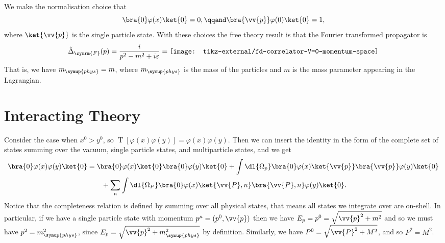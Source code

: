 \documentclass[fleqn]{NotesClass}
\DeclareMathOperator{\timeOrdering}{T}
\newcommand{\feynman}{\symrm{F}}
\newcommand{\phys}{\symup{phys}}
\begin{document}
    We make the normalisation choice that
    \begin{equation}
        \bra{0} \varphi(x)\ket{0} = 0, \qqand \bra{\vv{p}} \varphi(0) \ket{0} = 1,
    \end{equation}
    where \(\ket{\vv{p}}\) is the single particle state.
    With these choices the free theory result is that the Fourier transformed propagator is
    \begin{equation}
        \tilde{\Delta}_{\feynman}(p) = \frac{i}{p^2 - m^2 + i\varepsilon} = \hbox{\texttt{[image: tikz-external/fd-correlator-V=0-momentum-space]}}
    \end{equation}
    That is, we have \(m_{\phys} = m\), where \(m_{\phys}\) is the mass of the particles and \(m\) is the mass parameter appearing in the Lagrangian.
    
    \section{Interacting Theory}
    Consider the case when \(x^0 > y^0\), so \(\timeOrdering[\varphi(x)\varphi(y)] = \varphi(x)\varphi(y)\).
    Then we can insert the identity in the form of the complete set of states summing over the vacuum, single particle states, and multiparticle states, and we get
    \begin{align}
        \bra{0} \varphi(x)\varphi(y) \ket{0} &= \bra{0} \varphi(x) \ket{0} \bra{0} \varphi(y) \ket{0} + \int \dl{\Omega_p} \bra{0} \varphi(x) \ket{\vv{p}} \bra{\vv{p}} \varphi(y) \ket{0} \notag\\
        &\qquad + \sum_n \int \dl{\Omega_P} \bra{0} \varphi(x) \ket{\vv{P}, n} \bra{\vv{P}, n} \varphi(y) \ket{0}.
    \end{align}
    Notice that the completeness relation is defined by summing over all physical states, that means all states we integrate over are on-shell.
    In particular, if we have a single particle state with momentum \(p^\mu = (p^0, \vv{p})\) then we have \(E_p = p^0 = \sqrt{\vv{p}^2 + m^2}\) and so we must have \(p^2 = m_{\phys}^2\), since \(E_p = \sqrt{\vv{p}^2 + m_{\phys}^2}\) by definition.
    Similarly, we have \(P^0 = \sqrt{\vv{P}^2 + M^2}\), and so \(P^2 = M^2\).
    
\end{document}
